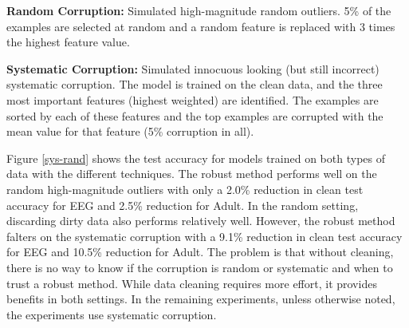 \vspace{0.5em}

\noindent\textbf{Random Corruption: } Simulated high-magnitude random outliers. 5\% of the examples are selected at random and a random feature is replaced with 3 times the highest feature value.

\vspace{0.5em}

\noindent\textbf{Systematic Corruption: } Simulated innocuous looking (but still incorrect) systematic corruption. The model is trained on the clean data, and the three most important features (highest weighted) are identified. The examples are sorted by each of these features and the top examples are corrupted with the mean value for that feature (5\% corruption in all). 

Figure \ref{sys-rand} shows the test accuracy for models trained on both types of data with the different techniques.
The robust method performs well on the random high-magnitude outliers with only a 2.0\% reduction in clean test accuracy for EEG and 2.5\% reduction for Adult.
In the random setting, discarding dirty data also performs relatively well.
However, the robust method falters on the systematic corruption with a 9.1\% reduction in clean test accuracy for EEG and 10.5\% reduction for Adult.
The problem is that without cleaning, there is no way to know if the corruption is random or systematic and when to trust a robust method.
While data cleaning requires more effort, it provides benefits in both settings.
In the remaining experiments, unless otherwise noted, the experiments use systematic corruption.

